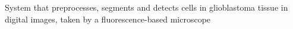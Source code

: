 System that preprocesses, segments and detects cells in glioblastoma tissue in digital images, taken by a fluorescence-\/based microscope 